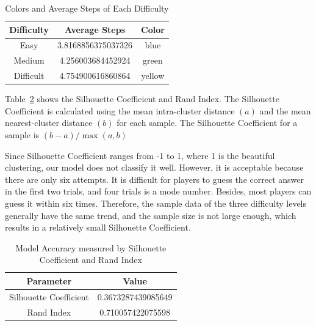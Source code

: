 \documentclass[12pt]{article}
\begin{document}
\begin{table}[h]
    \centering
    \begin{tabular}{|c|c|c|}
    \hline
    \textbf{Difficulty} & \textbf{Average Steps} &\textbf{Color}        \\ \hline
    Easy                & 3.8168856375037326     & blue                  \\ \hline
    Medium              & 4.256003684452924      & green                 \\ \hline
    Difficult           & 4.754900616860864      & yellow                \\ \hline
    \end{tabular} 
    \caption{Colors and Average Steps of Each Difficulty}
    \label{table5}
\end{table}

\vspace{0.3cm}
\noindent
Table~\ref{table7} shows the Silhouette Coefficient and Rand Index. The Silhouette Coefficient is calculated using the mean intra-cluster distance $(a)$ and the mean nearest-cluster distance $(b)$ for each sample. The Silhouette Coefficient for a sample is
$(b - a)/\max(a, b)$

\vspace{0.3cm}
\noindent
Since Silhouette Coefficient ranges from -1 to 1, where 1 is the beautiful clustering, our model does not classify it well. However, it is acceptable because there are only six attempts. It is difficult for players to guess the correct answer in the first two trials, and four trials is a mode number. Besides, most players can guess it within six times.  Therefore, the sample data of the three difficulty levels generally have the same trend, and the sample size is not large enough, which results in a relatively small Silhouette Coefficient.

\begin{table}
    \centering
    \begin{tabular}{|c|c|}
    \hline
    \textbf{Parameter} & \textbf{Value}     \\ \hline
    Silhouette Coefficient           & 0.3673287439085649  \\ \hline
    Rand Index                       & 0.710057422075598\\ \hline
    \end{tabular}
    \caption{Model Accuracy measured by Silhouette Coefficient and Rand Index}
    \label{table7}
\end{table}
\end{document}
